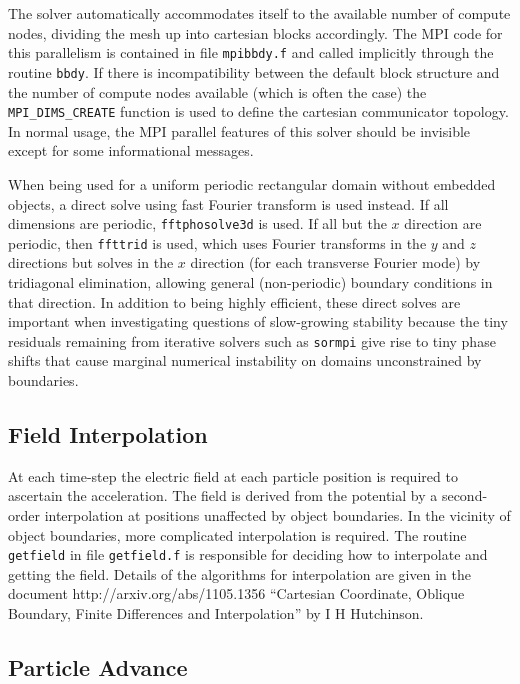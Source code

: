 \documentclass[12pt]{article}
\begin{document}
The solver automatically accommodates itself to the available number
of compute nodes, dividing the mesh up into cartesian blocks
accordingly.  The MPI code for this parallelism is contained in file
\verb!mpibbdy.f! and called implicitly through the routine
\verb!bbdy!. If there is incompatibility between the default block
structure and the number of compute nodes available (which is often
the case) the \verb!MPI_DIMS_CREATE! function is used to define the
cartesian communicator topology. In normal usage, the MPI parallel
features of this solver should be invisible except for some
informational messages.  

When being used for a uniform periodic rectangular domain without
embedded objects, a direct solve using fast Fourier transform is used
instead. If all dimensions are periodic, \verb!fftphosolve3d! is used.
If all but the $x$ direction are periodic, then \verb!ffttrid! is
used, which uses Fourier transforms in the $y$ and $z$ directions but
solves in the $x$ direction (for each transverse Fourier mode) by
tridiagonal elimination, allowing general (non-periodic) boundary
conditions in that direction. In addition to being highly efficient,
these direct solves are important when investigating questions of
slow-growing stability because the tiny residuals remaining from
iterative solvers such as \verb!sormpi! give rise to tiny phase shifts
that cause marginal numerical instability on domains unconstrained by
boundaries.

\subsection{Field Interpolation}

At each time-step the electric field at each particle position is
required to ascertain the acceleration. The field is derived from the
potential by a second-order interpolation at positions unaffected by
object boundaries. In the vicinity of object boundaries, more
complicated interpolation is required. The routine \verb!getfield! in
file \verb!getfield.f! is responsible for deciding how to interpolate
and getting the field. Details of the algorithms for interpolation are
given in the document http://arxiv.org/abs/1105.1356 ``Cartesian
Coordinate, Oblique Boundary, Finite Differences and Interpolation''
by I H Hutchinson.

\subsection{Particle Advance}
\end{document}
